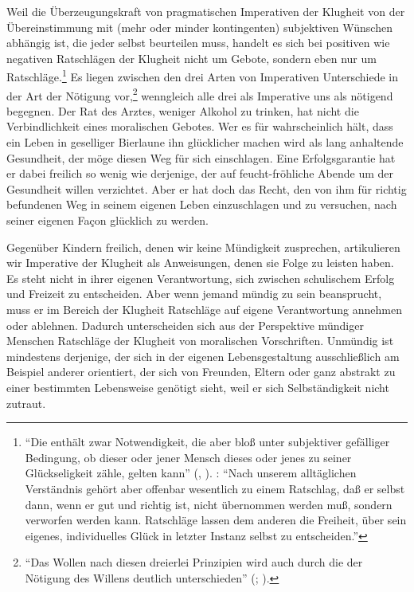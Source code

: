 Weil die Überzeugungskraft von pragmatischen Imperativen der Klugheit von der
Übereinstimmung mit (mehr oder minder kontingenten) subjektiven Wünschen
abhängig ist, die jeder selbst beurteilen muss, handelt es sich bei positiven
wie negativen Ratschlägen der Klugheit nicht um Gebote, sondern eben nur um
Ratschläge.\footnote{\enquote{Die  enthält zwar Notwendigkeit,
die aber bloß unter subjektiver gefälliger Bedingung, ob dieser oder jener
Mensch dieses oder jenes zu seiner Glückseligkeit zähle, gelten kann} (\cite[BA
44]{Kant:GrundlegungzurMetaphysikderSitten1965}, \cite[IV:
416.23-26]{Kant:GesammelteWerke1900ff.}). \cite[Vgl.
auch][189]{Schwaiger:KategorischeundandereImperative1999}:
\enquote{Nach unserem alltäglichen Verständnis gehört aber offenbar wesentlich
zu einem Ratschlag, daß er selbst dann, wenn er gut und richtig ist, nicht
übernommen werden muß, sondern verworfen werden kann. Ratschläge lassen dem
anderen die Freiheit, über sein eigenes, individuelles Glück in letzter Instanz
selbst zu entscheiden.}} Es liegen zwischen den drei Arten von Imperativen
Unterschiede in der Art der Nötigung
vor,\footnote{\enquote{Das Wollen nach diesen dreierlei Prinzipien wird auch
durch die  der Nötigung des Willens deutlich unterschieden}
\mkbibparens{\cite[][BA 43]{Kant:GrundlegungzurMetaphysikderSitten1965};
\cite[][IV: 416.15--16]{Kant:GesammelteWerke1900ff.}}.} wenngleich alle drei als
Imperative uns als nötigend begegnen. Der Rat des Arztes, weniger Alkohol zu trinken, hat nicht die Verbindlichkeit eines moralischen Gebotes. Wer es für wahrscheinlich hält, dass ein Leben in geselliger Bierlaune ihn glücklicher machen wird als lang anhaltende Gesundheit, der möge diesen Weg für sich einschlagen. Eine Erfolgsgarantie hat er dabei freilich so wenig wie derjenige,
der auf feucht-fröhliche Abende um der Gesundheit willen verzichtet.
Aber er hat doch das Recht, den von ihm für richtig befundenen Weg in seinem
eigenen Leben einzuschlagen und zu versuchen, nach seiner eigenen Fa\c{c}on
glücklich zu werden.


Gegenüber Kindern freilich, denen wir keine Mündigkeit zusprechen, artikulieren
wir Imperative der Klugheit als Anweisungen, denen sie Folge zu leisten haben.
Es steht nicht in ihrer eigenen Verantwortung,
sich zwischen schulischem Erfolg und Freizeit zu entscheiden. Aber wenn jemand
mündig zu sein beansprucht, muss er im Bereich der Klugheit Ratschläge auf
eigene Verantwortung annehmen oder ablehnen.
Dadurch unterscheiden sich aus der Perspektive mündiger Menschen Ratschläge der
Klugheit von moralischen Vorschriften. Unmündig ist mindestens derjenige, der
sich in der eigenen Lebensgestaltung ausschließlich am Beispiel anderer
orientiert, der sich von Freunden, Eltern oder ganz abstrakt  zu einer bestimmten Lebensweise genötigt sieht, weil er sich
Selbständigkeit nicht zutraut.

